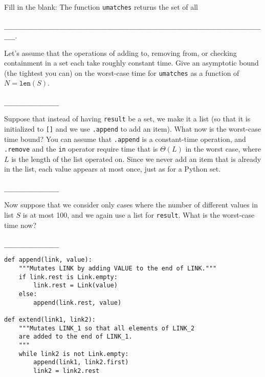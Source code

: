 \documentclass[twoside]{article}
\begin{document}
\begin{enumerate}
\begin{enumerate}
Fill in the blank: The function \texttt{umatches} returns the set of all\\\\
\lstinline{_________________________________________________________________________}.

Let's assume that the operations of adding to, removing from, or checking containment in a set each take roughly constant time. Give an asymptotic bound (the tightest you can) on the worst-case time for \texttt{umatches} as a function of $N = \texttt{len}(S)$.
~\\\\
\lstinline{_______________}

Suppose that instead of having \texttt{result} be a set, we make it a list (so that it is initialized to \texttt{[]} and we use \texttt{.append} to add an item). What now is the worst-case time bound? You can assume that \texttt{.append} is a constant-time operation, and \texttt{.remove} and the \texttt{in} operator require time that is $\Theta(L)$ in the worst case, where $L$ is the length of the list operated on. Since we never add an item that is already in the list, each value appears at most once, just as for a Python set.
~\\\\
\lstinline{_______________}

Now suppose that we consider only cases where the number of different values in list $S$ is at most 100, and we again use a list for \texttt{result}. What is the worst-case time now?
~\\\\
\lstinline{_______________}
\end{enumerate}


\begin{lstlisting}
def append(link, value):
    """Mutates LINK by adding VALUE to the end of LINK."""
    if link.rest is Link.empty:
        link.rest = Link(value)
    else:
        append(link.rest, value)

def extend(link1, link2):
    """Mutates LINK_1 so that all elements of LINK_2
    are added to the end of LINK_1.
    """
    while link2 is not Link.empty:
        append(link1, link2.first)
        link2 = link2.rest
\end{lstlisting}


\end{enumerate}
\end{document}
